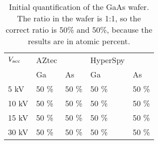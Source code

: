 \begin{table}[ht]
    \centering
    \caption{
        Initial quantification of the GaAs wafer.
        The ratio in the wafer is 1:1, so the correct ratio is 50\% and 50\%, because the results are in atomic percent.
    }
    \label{tab:initial_quantification}
    \begin{tabular}{m{1.5cm} m{1.5cm} m{1.5cm} m{1.5cm} m{1.5cm}}
        $V_\textnormal{acc}$ & AZtec &       & HyperSpy &       \\
                             & Ga    & As    & Ga       & As    \\
        \hline
        5 kV                 & 50 \% & 50 \% & 50 \%    & 50 \% \\
        10 kV                & 50 \% & 50 \% & 50 \%    & 50 \% \\
        15 kV                & 50 \% & 50 \% & 50 \%    & 50 \% \\
        30 kV                & 50 \% & 50 \% & 50 \%    & 50 \%
    \end{tabular}
\end{table}
